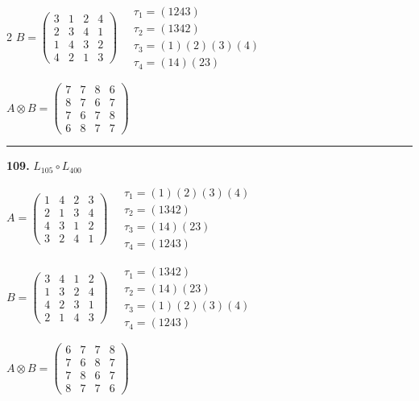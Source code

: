 \begin{multicols}{2}
$B = \begin{pmatrix} 3 & 1 & 2 & 4 \\ 2 & 3 & 4 & 1 \\ 1 & 4 & 3 & 2 \\ 4 & 2 & 1 & 3 \end{pmatrix} \quad \begin{matrix} \tau_{1}=(1 2 4 3) \\ \tau_{2}=(1 3 4 2) \\ \tau_{3}=(1)(2)(3)(4) \\ \tau_{4}=(1 4)(2 3) \end{matrix}$

$A \otimes B = \begin{pmatrix} 7 & 7 & 8 & 6 \\ 8 & 7 & 6 & 7 \\ 7 & 6 & 7 & 8 \\ 6 & 8 & 7 & 7 \end{pmatrix}$

\vspace{0.3em}
\hrule
\vspace{0.3em}

\noindent\textbf{109.} $L_{105} \circ L_{400}$

$A = \begin{pmatrix} 1 & 4 & 2 & 3 \\ 2 & 1 & 3 & 4 \\ 4 & 3 & 1 & 2 \\ 3 & 2 & 4 & 1 \end{pmatrix} \quad \begin{matrix} \tau_{1}=(1)(2)(3)(4) \\ \tau_{2}=(1 3 4 2) \\ \tau_{3}=(1 4)(2 3) \\ \tau_{4}=(1 2 4 3) \end{matrix}$

$B = \begin{pmatrix} 3 & 4 & 1 & 2 \\ 1 & 3 & 2 & 4 \\ 4 & 2 & 3 & 1 \\ 2 & 1 & 4 & 3 \end{pmatrix} \quad \begin{matrix} \tau_{1}=(1 3 4 2) \\ \tau_{2}=(1 4)(2 3) \\ \tau_{3}=(1)(2)(3)(4) \\ \tau_{4}=(1 2 4 3) \end{matrix}$

$A \otimes B = \begin{pmatrix} 6 & 7 & 7 & 8 \\ 7 & 6 & 8 & 7 \\ 7 & 8 & 6 & 7 \\ 8 & 7 & 7 & 6 \end{pmatrix}$


\end{multicols}
